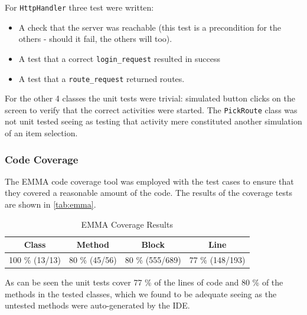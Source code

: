 For \texttt{HttpHandler} three test were written:

\begin{itemize}
	\item{A check that the server was reachable (this test is a precondition for the others - should it fail, the others will too).}
	\item{A test that a correct \texttt{login\_request} resulted in success }
	\item{A test that a \texttt{route\_request} returned routes.}
\end{itemize}

For the other 4 classes the unit tests were trivial: simulated button clicks on the screen to verify that the correct activities were started. The \texttt{PickRoute} class was not unit tested seeing as testing that activity mere constituted another simulation of an item selection.

\subsubsection{Code Coverage}
The EMMA code coverage tool was employed with the test cases to ensure that they covered a reasonable amount of the code. The results of the coverage tests are shown in \autoref{tab:emma}.

\begin{table}[!ht]
	\centering
	\begin{tabular}{| c | c | c | c |}
		\hline
		\textbf{Class} & \textbf{Method} & \textbf{Block} & \textbf{Line} \\ \hline
		100 \% (13/13) & 80 \% (45/56) & 80 \% (555/689) & 77 \% (148/193) \\
		\hline
	\end{tabular}
	\caption{EMMA Coverage Results}
	\label{tab:emma}
\end{table}

As can be seen the unit tests cover 77 \% of the lines of code and 80 \% of the methods in the tested classes, which we found to be adequate seeing as the untested methods were auto-generated by the \ac{IDE}.
